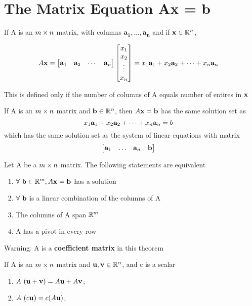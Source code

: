 \documentclass{report}
\begin{document}
\section{The Matrix Equation Ax = b}
\begin{definition}
\end{definition}
If A is an $m \times n$ matrix, with columns $\mathbf{a_1}, \ldots, \mathbf{a_n}$ and if $\mathbf{x} \in \mathbb{R}^n$,

\[
A \mathbf{x} = 
\begin{bmatrix}
\mathbf{a}_1 & \mathbf{a}_2 & \cdots & \mathbf{a}_n
\end{bmatrix}
\begin{bmatrix}
x_1 \\ x_2 \\ \vdots \\ x_n
\end{bmatrix}
= x_1 \mathbf{a}_1 + x_2 \mathbf{a}_2 + \cdots + x_n \mathbf{a}_n
\]

This is defined only if the number of columns of A equals number of entires in $\mathbf{x}$

\begin{theorem}
    If A is an $m \times n$ matrix and $\mathbf{b} \in \mathbb{R}^n$, then $A \mathbf{x} = \mathbf{b}$ has the same solution set as 
    \[
x_1 \mathbf{a}_1 + x_2 \mathbf{a}_2 + \cdots + x_n \mathbf{a}_n = b
\]
which has the same solution set as the system of linear equations with matrix
\[
\begin{bmatrix}
    \mathbf{a}_1 & \ldots & \mathbf{a}_n & \mathbf{b}
\end{bmatrix}
\]
\end{theorem}

\begin{theorem}
    Let A be a $m \times n$ matrix. The following statements are equivalent
    \begin{enumerate}[label=\alph*.]
        \item $\forall\ \mathbf{b} \in \mathbb{R}^m, A \mathbf{x} = \mathbf{b}$ has a solution
        \item $\forall\ \mathbf{b}$ is a linear combination of the columns of A
        \item The columns of A span $\mathbb{R}^m$
        \item A has a pivot in every row
    \end{enumerate}
\end{theorem}
Warning: A is a \textbf{coefficient matrix} in this theorem

\begin{theorem}
    If A is an $m \times n$ matrix and $\mathbf{u},\mathbf{v} \in \mathbb{R}^n$, and c is a scalar
    \begin{enumerate}[label=\alph*.]
        \item $A\ (\mathbf{u} + \mathbf{v}) = A \mathbf{u} + A \mathbf{v}$;
        \item $A\ (c \mathbf{u}) = c (A \mathbf{u})$;
    \end{enumerate}
\end{theorem}
    
\end{document}
